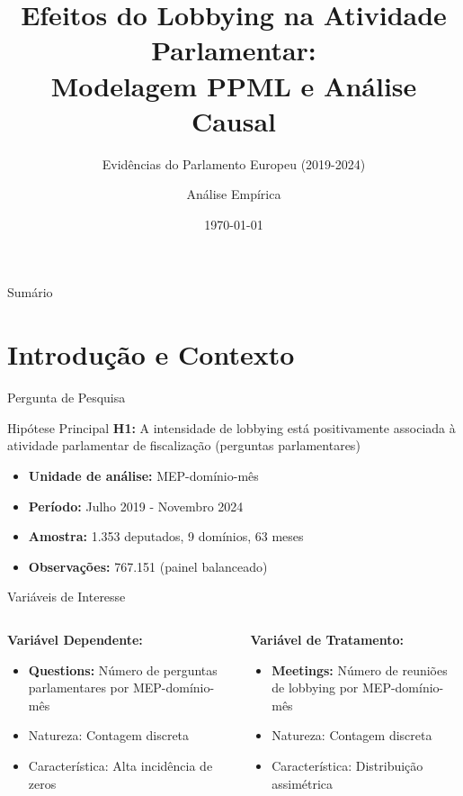 \documentclass[aspectratio=169]{beamer}
\title{Efeitos do Lobbying na Atividade Parlamentar: \\ Modelagem PPML e Análise Causal}
\subtitle{Evidências do Parlamento Europeu (2019-2024)}
\author{Análise Empírica}
\institute{Estudo de Lobbying e Política Europeia}
\date{\today}
\begin{document}
\begin{frame}
\titlepage
\end{frame}

\begin{frame}{Sumário}
\tableofcontents
\end{frame}


\section{Introdução e Contexto}

\begin{frame}{Pergunta de Pesquisa}
\begin{block}{Hipótese Principal}
\textbf{H1:} A intensidade de lobbying está positivamente associada à atividade parlamentar de fiscalização (perguntas parlamentares)
\end{block}

\vspace{0.5cm}

\begin{itemize}
\item \textbf{Unidade de análise:} MEP-domínio-mês
\item \textbf{Período:} Julho 2019 - Novembro 2024
\item \textbf{Amostra:} 1.353 deputados, 9 domínios, 63 meses
\item \textbf{Observações:} 767.151 (painel balanceado)
\end{itemize}
\end{frame}

\begin{frame}{Variáveis de Interesse}
\begin{columns}
\begin{column}{0.5\textwidth}
\textbf{Variável Dependente:}
\begin{itemize}
\item \textbf{Questions:} Número de perguntas parlamentares por MEP-domínio-mês
\item Natureza: Contagem discreta
\item Característica: Alta incidência de zeros
\end{itemize}
\end{column}
\begin{column}{0.5\textwidth}
\textbf{Variável de Tratamento:}
\begin{itemize}
\item \textbf{Meetings:} Número de reuniões de lobbying por MEP-domínio-mês
\item Natureza: Contagem discreta
\item Característica: Distribuição assimétrica
\end{itemize}
\end{column}
\end{columns}
\end{frame}
\end{document}
